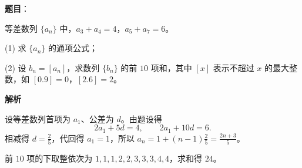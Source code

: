 
\begin{answer}

\textbf{题目}：

等差数列 $\{a_n\}$ 中，$a_3+a_4=4$，$a_5+a_7=6$。

   (1) 求 $\{a_n\}$ 的通项公式；

   (2) 设 $b_n=[a_n]$，求数列 $\{b_n\}$ 的前 $10$ 项和，其中 $[x]$ 表示不超过 $x$ 的最大整数，如 $[0.9]=0$，$[2.6]=2$。

\textbf{解析}


设等差数列首项为 $a_1$、公差为 $d$。由题设得
\nopagebreak[4]
\[
2a_1+5d=4,\qquad 2a_1+10d=6.
\]
相减得 $d=\frac25$，代回得 $a_1=1$，所以
$a_n=1+(n-1)\frac25=\frac{2n+3}{5}$。


前 $10$ 项的下取整依次为 $1,1,1,2,2,3,3,3,4,4$，求和得 $24$。



\end{answer}
